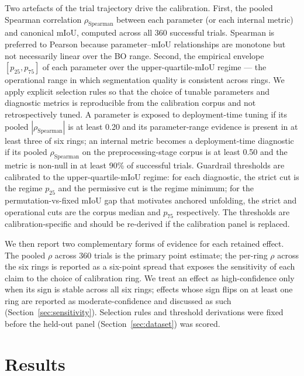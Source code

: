 \documentclass[a4paper,fleqn]{cas-dc}
\begin{document}
Two artefacts of the trial trajectory drive the calibration. First, the pooled Spearman correlation $\rho_{\mathrm{Spearman}}$ between each parameter (or each internal metric) and canonical mIoU, computed across all 360 successful trials. Spearman is preferred to Pearson because parameter--mIoU relationships are monotone but not necessarily linear over the BO range. Second, the empirical envelope $[p_{25}, p_{75}]$ of each parameter over the upper-quartile-mIoU regime --- the operational range in which segmentation quality is consistent across rings. We apply explicit selection rules so that the choice of tunable parameters and diagnostic metrics is reproducible from the calibration corpus and not retrospectively tuned. A parameter is exposed to deployment-time tuning if its pooled $|\rho_{\mathrm{Spearman}}|$ is at least 0.20 and its parameter-range evidence is present in at least three of six rings; an internal metric becomes a deployment-time diagnostic if its pooled $\rho_{\mathrm{Spearman}}$ on the preprocessing-stage corpus is at least 0.50 and the metric is non-null in at least 90\% of successful trials. Guardrail thresholds are calibrated to the upper-quartile-mIoU regime: for each diagnostic, the strict cut is the regime $p_{25}$ and the permissive cut is the regime minimum; for the permutation-vs-fixed mIoU gap that motivates anchored unfolding, the strict and operational cuts are the corpus median and $p_{75}$ respectively. The thresholds are calibration-specific and should be re-derived if the calibration panel is replaced.

We then report two complementary forms of evidence for each retained effect. The pooled $\rho$ across 360 trials is the primary point estimate; the per-ring $\rho$ across the six rings is reported as a six-point spread that exposes the sensitivity of each claim to the choice of calibration ring. We treat an effect as high-confidence only when its sign is stable across all six rings; effects whose sign flips on at least one ring are reported as moderate-confidence and discussed as such (Section~\ref{sec:sensitivity}). Selection rules and threshold derivations were fixed before the held-out panel (Section~\ref{sec:dataset}) was scored.






\section{Results}\label{sec:results}
\end{document}
